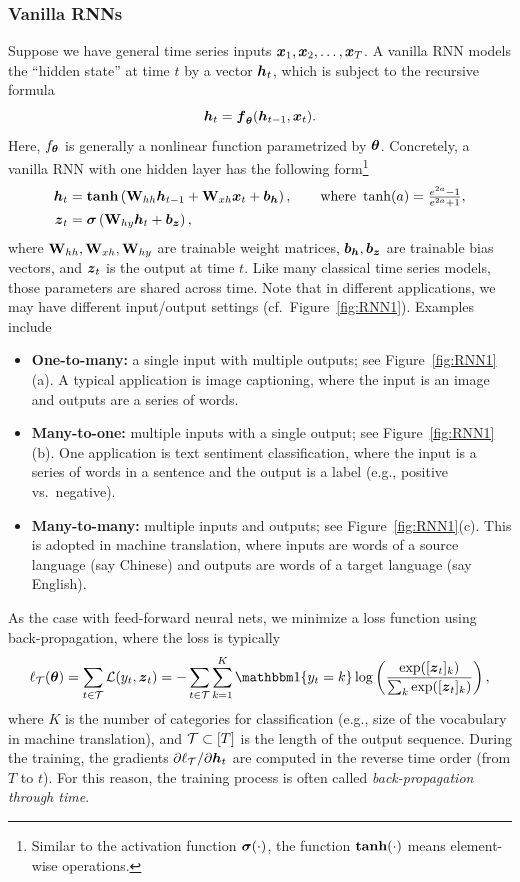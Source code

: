 \subsubsection{Vanilla RNNs}
Suppose we have general time series inputs $\text{\boldmath $x$}_1,\text{\boldmath $x$}_2,\ldots,\text{\boldmath $x$}_T$. A vanilla RNN models the ``hidden state'' at time $t$ by a vector $\text{\boldmath $h$}_t$, which is subject to the recursive formula
\begin{equation}\label{eq:recur}
\text{\boldmath $h$}_t  = \text{\boldmath $f$}_{\text{\boldmath $\theta$}}(\text{\boldmath $h$}_{t-1}, \text{\boldmath $x$}_t).
\end{equation}
Here, $f_{\text{\boldmath $\theta$}}$ is generally a nonlinear function parametrized by $\text{\boldmath $\theta$}$. Concretely, a vanilla RNN with one hidden layer has the following form\footnote{Similar to the activation function $\bm{\sigma}(\cdot)$, the function $\mathrm{\textbf{tanh}}(\cdot)$ means element-wise operations.}
\begin{align*}
\text{\boldmath $h$}_t  &= \mathrm{\textbf{tanh}}\left( \mathrm{\bf W}_{hh} \text{\boldmath $h$}_{t-1}+ \mathrm{\bf W}_{xh} \text{\boldmath $x$}_t + \text{\boldmath $b$}_{\text{\boldmath $h$}} \right), \qquad \text{where}~ \tanh(a) = \tfrac{e^{2a} - 1}{e^{2a} + 1}, \\
\text{\boldmath $z$}_t &= \bm{\sigma} \left(\mathrm{\bf W}_{hy} \text{\boldmath $h$}_t + \text{\boldmath $b$}_{\text{\boldmath $z$}} \right),
\end{align*}
where $\mathrm{\bf W}_{hh}, \mathrm{\bf W}_{xh}, \mathrm{\bf W}_{hy}$ are trainable weight matrices, $\text{\boldmath $b$}_{\text{\boldmath $h$}}, \text{\boldmath $b$}_{\text{\boldmath $z$}}$ are trainable bias vectors, and $\text{\boldmath $z$}_t$ is the output at time $t$. Like many classical time series models, those parameters are shared across time. Note that in different applications, we may have different input/output settings (cf.~Figure~\ref{fig:RNN1}). Examples include
\begin{itemize}
\item{ \textbf{One-to-many:} a single input with multiple outputs; see Figure~\ref{fig:RNN1}(a). A typical application is image captioning, where the input is an image and outputs are a series of words.
}
\item{ \textbf{Many-to-one:} multiple inputs with a single output; see Figure~\ref{fig:RNN1}(b). One application is text sentiment classification, where the input is a series of words in a sentence and the output is a label (e.g., positive vs.~negative).
}
\item{ \textbf{Many-to-many:} multiple inputs and outputs; see Figure~\ref{fig:RNN1}(c). This is adopted in machine translation, where inputs are words of a source language (say Chinese) and outputs are words of a target language (say English).
}
\end{itemize}

As the case with feed-forward neural nets, we minimize a loss function using back-propagation, where the loss is typically
\begin{equation*}
\ell_{\cT}(\btheta) = \sum_{t \in \cT} \cL(y_t, \zz_t) = - \sum_{t \in \cT} \sum_{k=1}^K \bbone\{y_t = k\} \log \left( \frac{\exp([\zz_t]_k)}{\sum_k \exp([\zz_t]_k)} \right),
\end{equation*}
where $K$ is the number of categories for classification (e.g., size of the vocabulary in machine translation), and $\mathcal{T} \subset [T]$ is the length of the output sequence. During the training, the gradients $\partial \ell_{\mathcal{T}} / \partial \text{\boldmath $h$}_t$ are computed in the reverse time order (from $T$ to $t$). For this reason, the training process is often called \textit{back-propagation through time}. 

